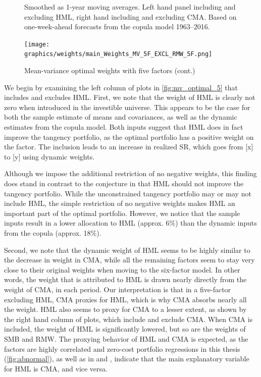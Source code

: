 \begin{figure}[htbp]
  \begin{longcaption}
    Smoothed as 1-year moving averages. Left hand panel including and excluding HML, right hand including and excluding CMA. Based on one-week-ahead forecasts from the copula model 1963--2016.
  \end{longcaption}
\end{figure}

\begin{figure}[htbp]
  \ContinuedFloat
  \centering
  \texttt{[image: graphics/weights/main\_Weights\_MV\_5F\_EXCL\_RMW\_5F.png]}
  \footnotesize
  \caption{Mean-variance optimal weights with five factors (cont.)}
\end{figure}

We begin by examining the left column of plots in \autoref{fig:mv_optimal_5} that includes and excludes HML. First, we note that the weight of HML is clearly not zero when introduced in the investible universe. This appears to be the case for both the sample estimate of means and covariances, as well as the dynamic estimates from the copula model. Both inputs suggest that HML does in fact improve the tangency portfolio, as the optimal portfolio has a positive weight on the factor. The inclusion leads to an increase in realized SR, which goes from [x] to [y] using dynamic weights.

Although we impose the additional restriction of no negative weights, this finding does stand in contrast to the conjecture in \textcite{FF2015} that HML should not improve the tangency portfolio. While the unconstrained tangency portfolio may or may not include HML, the simple restriction of no negative weights makes HML an important part of the optimal portfolio. However, we notice that the sample inputs result in a lower allocation to HML (approx. 6\%) than the dynamic inputs from the copula (approx. 18\%).

Second, we note that the dynamic weight of HML seems to be highly similar to the decrease in weight in CMA, while all the remaining factors seem to stay very close to their original weights when moving to the six-factor model. In other words, the weight that is attributed to HML is drawn nearly directly from the weight of CMA, in each period. Our interpretation is that in a five-factor excluding HML, CMA proxies for HML, which is why CMA absorbs nearly all the weight. HML also seems to proxy for CMA to a lesser extent, as shown by the right hand column of plots, which include and exclude CMA. When CMA is included, the weight of HML is significantly lowered, but so are the weights of SMB and RMW. The proxying behavior of HML and CMA is expected, as the factors are highly correlated and zero-cost portfolio regressions in this thesis (\autoref{fig:abnormal}), as well as in \textcite{FF2015} and \textcite{Asness2015}, indicate that the main explanatory variable for HML is CMA, and vice versa.

